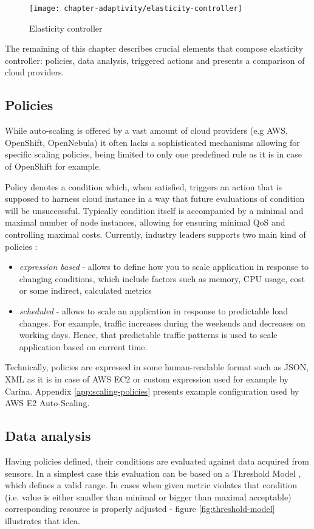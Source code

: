 \begin{figure}[!ht]
  \begin{center}
    \texttt{[image: chapter-adaptivity/elasticity-controller]}
  \end{center}
  \caption{Elasticity controller}
  \label{fig:elasticity-controller}
\end{figure}

The remaining of this chapter describes crucial elements that compose elasticity controller: policies, data analysis, triggered actions and presents a comparison of cloud providers.
 
\subsection{Policies}
While auto-scaling is offered by a vast amount of cloud providers (e.g AWS, OpenShift, OpenNebula) it often lacks a sophisticated mechanisms allowing for specific scaling policies, being limited to only one predefined rule as it is in case of OpenShift for example. 
 
Policy denotes a condition which, when satisfied, triggers an action that is supposed to harness cloud instance in a way that future evaluations of condition will be unsuccessful. Typically condition itself is accompanied by a minimal and maximal number of node instances, allowing for ensuring minimal QoS and controlling maximal costs. Currently, industry leaders supports two main kind of policies \cite{AmazonAutoScaling}:
\begin{itemize}
 \item \textit{expression based} - allows to define how you to scale application in response to changing conditions, which include factors such as memory, CPU usage, cost or some indirect, calculated metrics
 \item \textit{scheduled} - allows to scale an application in response to predictable load changes. For example, traffic increases during the weekends and decreases on working days. Hence, that predictable traffic patterns is used to scale application based on current time.
\end{itemize}

Technically, policies are expressed in some human-readable format such as JSON, XML as it is in case of AWS EC2 or custom expression used for example by Carina. Appendix \ref{app:scaling-policies} presents example configuration used by AWS E2 Auto-Scaling.

\subsection{Data analysis}
Having policies defined, their conditions are evaluated against data acquired from sensors. In a simplest case this evaluation can be based on a Threshold Model \cite{LiWoZh05}, which defines a valid range. In cases when given metric violates that condition (i.e. value is either smaller than minimal or bigger than maximal acceptable) corresponding resource is properly adjusted - figure \ref{fig:threshold-model} illustrates that idea.

